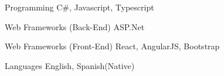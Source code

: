 


\begin{cvskills}


\cvskill
{Programming} %
{C\#, Javascript, Typescript} %


\cvskill
{Web Frameworks (Back-End)} %
{ASP.Net} %

\cvskill
{Web Frameworks (Front-End)} %
{React, AngularJS, Bootstrap} %


\cvskill
{Languages} %
{English, Spanish(Native)} %

\end{cvskills}
